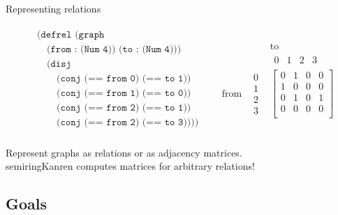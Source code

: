 \documentclass{beamer}
\begin{document}
\begin{frame}[label=representing-relations]{Representing relations}


	\begin{align*}
		\begin{aligned}
			& \texttt{(defrel (graph} \\
			&\quad \texttt{(from : (Num 4)) (to : (Num 4)))} \\
			&\quad \texttt{(disj} \\
			&\quad\quad \texttt{(conj (== from 0) (== to 1))} \\
			&\quad\quad \texttt{(conj (== from 1) (== to 0))} \\
			&\quad\quad \texttt{(conj (== from 2) (== to 1))} \\
			&\quad\quad \texttt{(conj (== from 2) (== to 3))))} \\
		\end{aligned}
		&&
		\begin{matrix}
			& & \text{to} \\
			& & \begin{matrix} 0 & 1 & 2 & 3 \end{matrix} \\
			\text{from} & \begin{matrix} 0 \\ 1 \\ 2 \\ 3 \end{matrix} &
			\begin{bmatrix}
				0 & 1 & 0 & 0 \\
				1 & 0 & 0 & 0 \\
				0 & 1 & 0 & 1 \\
				0 & 0 & 0 & 0 \\
			\end{bmatrix}
		\end{matrix}
	\end{align*}

	Represent graphs as relations or as adjacency matrices.\\
	semiringKanren computes matrices for arbitrary relations!

\end{frame}

\subsection{Goals}
\end{document}
